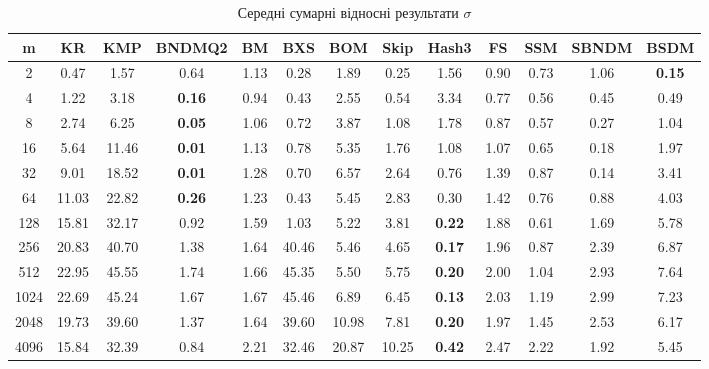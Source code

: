 \documentclass[a4paper,14pt]{extarticle} %
\begin{document}
				\begin{table}[H]
					\centering
					\scriptsize
					\begin{tabular}{|c|c|c|c|c|c|c|c|c|c|c|c|c|}
					\hline
					\textbf{m} & \textbf{KR} & \textbf{KMP} & \textbf{BNDMQ2} & \textbf{BM} & \textbf{BXS} & \textbf{BOM} & \textbf{Skip} & \textbf{Hash3} & \textbf{FS} & \textbf{SSM} & \textbf{SBNDM} & \textbf{BSDM} \\
					\hline
					2 & 0.47 & 1.57 & 0.64 & 1.13 & 0.28 & 1.89 & 0.25 & 1.56 & 0.90 & 0.73 & 1.06 & \textbf{0.15} \\
					\hline
					4 & 1.22 & 3.18 & \textbf{0.16} & 0.94 & 0.43 & 2.55 & 0.54 & 3.34 & 0.77 & 0.56 & 0.45 & 0.49 \\
					\hline
					8 & 2.74 & 6.25 & \textbf{0.05} & 1.06 & 0.72 & 3.87 & 1.08 & 1.78 & 0.87 & 0.57 & 0.27 & 1.04 \\
					\hline
					16 & 5.64 & 11.46 & \textbf{0.01} & 1.13 & 0.78 & 5.35 & 1.76 & 1.08 & 1.07 & 0.65 & 0.18 & 1.97 \\
					\hline
					32 & 9.01 & 18.52 & \textbf{0.01} & 1.28 & 0.70 & 6.57 & 2.64 & 0.76 & 1.39 & 0.87 & 0.14 & 3.41 \\
					\hline
					64 & 11.03 & 22.82 & \textbf{0.26} & 1.23 & 0.43 & 5.45 & 2.83 & 0.30 & 1.42 & 0.76 & 0.88 & 4.03 \\
					\hline
					128 & 15.81 & 32.17 & 0.92 & 1.59 & 1.03 & 5.22 & 3.81 & \textbf{0.22} & 1.88 & 0.61 & 1.69 & 5.78 \\
					\hline
					256 & 20.83 & 40.70 & 1.38 & 1.64 & 40.46 & 5.46 & 4.65 & \textbf{0.17} & 1.96 & 0.87 & 2.39 & 6.87 \\
					\hline
					512 & 22.95 & 45.55 & 1.74 & 1.66 & 45.35 & 5.50 & 5.75 & \textbf{0.20} & 2.00 & 1.04 & 2.93 & 7.64 \\
					\hline
					1024 & 22.69 & 45.24 & 1.67 & 1.67 & 45.46 & 6.89 & 6.45 & \textbf{0.13} & 2.03 & 1.19 & 2.99 & 7.23 \\
					\hline
					2048 & 19.73 & 39.60 & 1.37 & 1.64 & 39.60 & 10.98 & 7.81 & \textbf{0.20} & 1.97 & 1.45 & 2.53 & 6.17 \\
					\hline
					4096 & 15.84 & 32.39 & 0.84 & 2.21 & 32.46 & 20.87 & 10.25 & \textbf{0.42} & 2.47 & 2.22 & 1.92 & 5.45 \\
					\hline
					\end{tabular}
					\caption{Середні сумарні відносні результати $\sigma$}
					\label{table:random_relative}
					\end{table}
\end{document}

